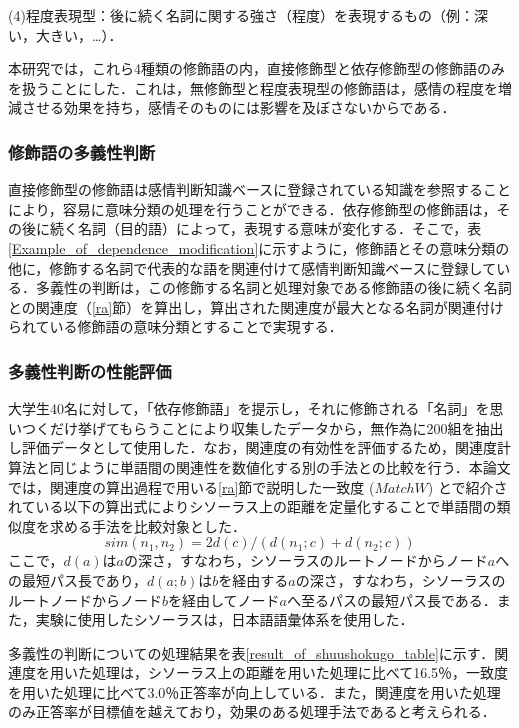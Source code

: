 \documentclass[japanese]{jnlp_1.3a}
\begin{document}
(4)程度表現型：後に続く名詞に関する強さ（程度）を表現するもの（例：深い，大きい，…）．

本研究では，これら4種類の修飾語の内，直接修飾型と依存修飾型の修飾語のみを扱うことにした．これは，無修飾型と程度表現型の修飾語は，感情の程度を増減させる効果を持ち，感情そのものには影響を及ぼさないからである．


\subsubsection{修飾語の多義性判断}\label{judgement_of_shuushokugo}
直接修飾型の修飾語は感情判断知識ベースに登録されている知識を参照することにより，容易に意味分類の処理を行うことができる．依存修飾型の修飾語は，その後に続く名詞（目的語）によって，表現する意味が変化する．そこで，表\ref{Example_of_dependence_modification}に示すように，修飾語とその意味分類の他に，修飾する名詞で代表的な語を関連付けて感情判断知識ベースに登録している．多義性の判断は，この修飾する名詞と処理対象である修飾語の後に続く名詞との関連度（\ref{ra}節）を算出し，算出された関連度が最大となる名詞が関連付けられている修飾語の意味分類とすることで実現する．

\subsubsection{多義性判断の性能評価}\label{result_of_shuushokugo}
大学生40名に対して，「依存修飾語」を提示し，それに修飾される「名詞」を思いつくだけ挙げてもらうことにより収集したデータから，無作為に200組を抽出し評価データとして使用した．なお，関連度の有効性を評価するため，関連度計算法と同じように単語間の関連性を数値化する別の手法との比較を行う．本論文では，関連度の算出過程で用いる\ref{ra}節で説明した一致度 ($MatchW$) と\cite{nagao:96}で紹介されている以下の算出式によりシソーラス上の距離を定量化することで単語間の類似度を求める手法を比較対象とした．
\[
 sim(n_1, n_2) = 2d(c)/(d(n_1;c)+d(n_2;c))
\]
ここで，$d(a)$は$a$の深さ，すなわち，シソーラスのルートノードからノード$a$への最短パス長であり，$d(a;b)$は$b$を経由する$a$の深さ，すなわち，シソーラスのルートノードからノード$b$を経由してノード$a$へ至るパスの最短パス長である．また，実験に使用したシソーラスは，日本語語彙体系\cite{ntt:97}を使用した．

多義性の判断についての処理結果を表\ref{result_of_shuushokugo_table}に示す．関連度を用いた処理は，シソーラス上の距離を用いた処理に比べて16.5{\kern0pt}％，一致度を用いた処理に比べて3.0{\kern0pt}％正答率が向上している．また，関連度を用いた処理のみ正答率が目標値を越えており，効果のある処理手法であると考えられる．
\end{document}
